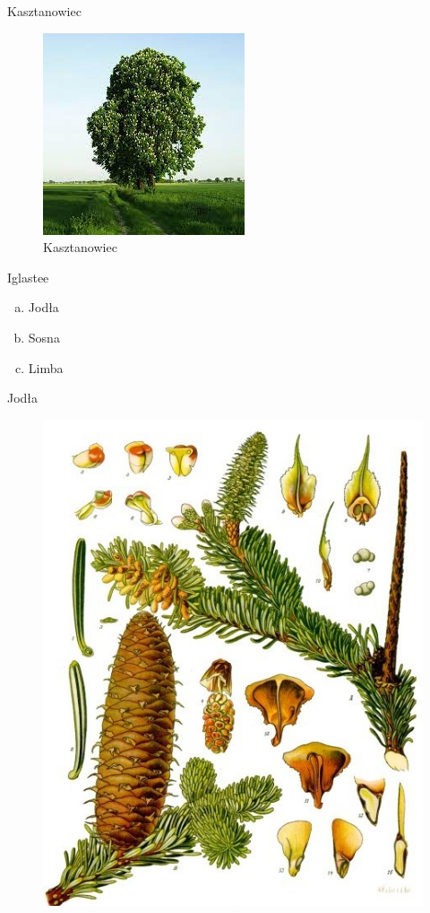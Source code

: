 \documentclass{beamer}
\begin{document}
\begin{frame}{Kasztanowiec}
\begin{figure}[h!]
\includegraphics[scale=0.7]{kasz.jpg}
\caption{Kasztanowiec \cite{Wiki}}
\label{kas}
\end{figure}
\end{frame}

\begin{frame}{Iglastee}
\begin{enumerate}[a)]
\item Jodła
\pause
\item Sosna
\pause
\item Limba
\end{enumerate}
\end{frame}

\begin{frame}{Jodła}
\begin{figure}[h!]
\includegraphics[scale=0.3]{jod.jpg}
\end{figure}
\end{frame}
\end{document}
